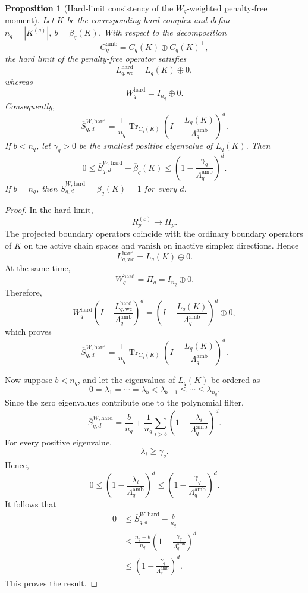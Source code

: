 \documentclass[10pt,a4paper]{amsart}
\newtheorem{proposition}{Proposition}
\begin{document}
\begin{proposition}[Hard-limit consistency of the \(W_q\)-weighted penalty-free moment]
Let \(K\) be the corresponding hard complex and define 
$n_q
=
|K^{(q)}|,
~
b
=
\beta_q(K)$.
With respect to the decomposition
\[
C_q^{\mathrm{amb}}
=
C_q(K)
\oplus
C_q(K)^\perp,
\]
the hard limit of the penalty-free operator satisfies
\[
L_{q,\mathrm{wc}}^{\mathrm{hard}}
=
L_q(K)
\oplus
0,
\]
whereas
\[
W_q^{\mathrm{hard}}
=
I_{n_q}
\oplus
0.
\]
Consequently,
\[
\overline S_{q,d}^{W,\mathrm{hard}}
=
\frac{1}{n_q}
\operatorname{Tr}_{C_q(K)}
\left(
I-
\frac{
L_q(K)
}{
\Lambda_q^{\mathrm{amb}}
}
\right)^d.
\]
If \(b<n_q\), let \(\gamma_q>0\) be the smallest positive eigenvalue of \(L_q(K)\). Then
\[
0
\le
\overline S_{q,d}^{W,\mathrm{hard}}
-
\overline\beta_q(K)
\le
\left(
1-
\frac{
\gamma_q
}{
\Lambda_q^{\mathrm{amb}}
}
\right)^d.
\]
If \(b=n_q\), then
$\overline S_{q,d}^{W,\mathrm{hard}}
=
\overline\beta_q(K)
=
1$
for every \(d\).
\end{proposition}

\begin{proof}
In the hard limit,
\[
R_p^{(\varepsilon)}
\longrightarrow
\Pi_p.
\]
The projected boundary operators coincide with the ordinary boundary operators of \(K\) on the active chain spaces and vanish on inactive simplex directions. Hence
\[
L_{q,\mathrm{wc}}^{\mathrm{hard}}
=
L_q(K)\oplus 0.
\]
At the same time,
\[
W_q^{\mathrm{hard}}
=
\Pi_q
=
I_{n_q}\oplus 0.
\]
Therefore,
\[
W_q^{\mathrm{hard}}
\left(
I-
\frac{
L_{q,\mathrm{wc}}^{\mathrm{hard}}
}{
\Lambda_q^{\mathrm{amb}}
}
\right)^d
=
\left(
I-
\frac{
L_q(K)
}{
\Lambda_q^{\mathrm{amb}}
}
\right)^d
\oplus
0,
\]
which proves
\[
\overline S_{q,d}^{W,\mathrm{hard}}
=
\frac{1}{n_q}
\operatorname{Tr}_{C_q(K)}
\left(
I-
\frac{
L_q(K)
}{
\Lambda_q^{\mathrm{amb}}
}
\right)^d.
\]

Now suppose \(b<n_q\), and let the eigenvalues of \(L_q(K)\) be ordered as
\[
0
=
\lambda_1
=
\cdots
=
\lambda_b
<
\lambda_{b+1}
\le
\cdots
\le
\lambda_{n_q}.
\]
Since the zero eigenvalues contribute one to the polynomial filter,
\[
\overline S_{q,d}^{W,\mathrm{hard}}
=
\frac{b}{n_q}
+
\frac{1}{n_q}
\sum_{i>b}
\left(
1-
\frac{
\lambda_i
}{
\Lambda_q^{\mathrm{amb}}
}
\right)^d.
\]
For every positive eigenvalue,
\[
\lambda_i\ge\gamma_q.
\]
Hence,
\[
0
\le
\left(
1-
\frac{
\lambda_i
}{
\Lambda_q^{\mathrm{amb}}
}
\right)^d
\le
\left(
1-
\frac{
\gamma_q
}{
\Lambda_q^{\mathrm{amb}}
}
\right)^d.
\]
It follows that
\[
\begin{aligned}
0
&\le
\overline S_{q,d}^{W,\mathrm{hard}}
-
\frac{b}{n_q}
\\
&\le
\frac{
n_q-b
}{
n_q
}
\left(
1-
\frac{
\gamma_q
}{
\Lambda_q^{\mathrm{amb}}
}
\right)^d
\\
&\le
\left(
1-
\frac{
\gamma_q
}{
\Lambda_q^{\mathrm{amb}}
}
\right)^d.
\end{aligned}
\]
This proves the result.
\end{proof}
\end{document}
